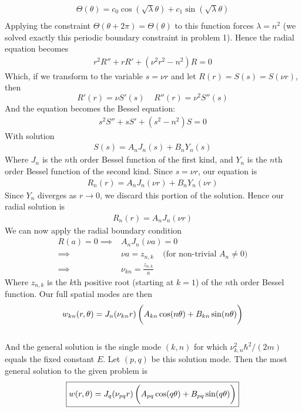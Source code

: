 \documentclass[12pt]{article}
\begin{document}
\begin{enumerate}[(a)]
{\begin{align*}
\Theta(\theta) = c_0 \cos(\sqrt{\lambda} \theta) + c_1 \sin(\sqrt{\lambda} \theta) \\
\end{align*}
Applying the constraint $\Theta(\theta + 2\pi) = \Theta(\theta)$ to this function forces $\lambda = n^2$ (we solved exactly this periodic boundary constraint in problem 1). Hence the radial equation becomes
\begin{align*}
r^2 R'' + rR' + \left( \nu^2 r^2 - n^2 \right)R = 0
\end{align*}
Which, if we transform to the variable $s = \nu r$ and let $R(r) = S(s) = S(\nu r)$, then
$$R'(r) = \nu S'(s) \;\;\;\; R''(r) = \nu^2 S''(s)$$
And the equation becomes the Bessel equation:
\begin{align*}
s^2 S'' + sS' + \left(s^2 - n^2 \right)S = 0
\end{align*}
With solution 
\begin{align*}
S(s) = A_n J_n(s) + B_n Y_n(s)
\end{align*}
Where $J_n$ is the $n$th order Bessel function of the first kind, and $Y_n$ is the $n$th order Bessel function of the second kind. Since $s = \nu r$, our equation is
\begin{align*}
R_n(r) = A_n J_n(\nu r) + B_n Y_n(\nu r)
\end{align*}
Since $Y_n$ diverges as $r \to 0$, we discard this portion of the solution. Hence our radial solution is
\begin{align*}
R_n(r) = A_n J_n(\nu r)
\end{align*}
We can now apply the radial boundary condition
\begin{align*}
R(a) = 0 \implies& A_n J_n (\nu a) = 0 \\
\implies& \nu a = z_{n,k} \;\;\;\; \text{(for non-trivial $A_n \neq 0$)} \\
\implies& \nu_{kn} = \frac{z_{n,k}}{a}
\end{align*}
Where $z_{n,k}$ is the $k$th positive root (starting at $k=1$) of the $n$th order Bessel function.
Our full spatial modes are then 
\begin{align*}
w_{kn}(r, \theta) = J_n(\nu_{kn} r) \left( \vphantom{\frac{1}{1}} A_{kn} \cos(n \theta) + B_{kn} \sin(n \theta)  \right)
\end{align*} \\
And the general solution is the single mode $(k,n)$ for which $\nu_{k,n}^2\hbar^2 / (2m)$ equals the fixed constant $E$. Let $(p,q)$ be this solution mode. Then the most general solution to the given problem is
\begin{align*}
\boxed{w(r, \theta) = J_{q}(\nu_{pq} r) \left( \vphantom{\frac{1}{1}} A_{pq} \cos(q \theta) + B_{pq} \sin(q \theta)  \right)}
\end{align*} \\
}


\end{enumerate}
\end{document}
